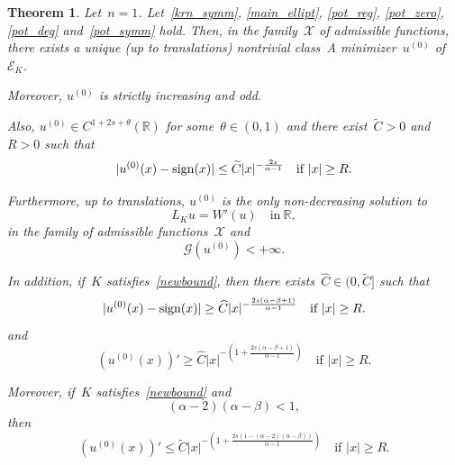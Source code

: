 \documentclass[10pt,a4paper]{amsart}
\newtheorem{theorem}{Theorem}[section]
\numberwithin{equation}{section}
\newcommand{\R}{\mathbb{R}}
\newcommand{\Ec}{\mathcal{E}_K}
\begin{document}
  \begin{theorem}\label{main_thm_symm}
Let~$n=1$. Let~\eqref{krn_symm}, \eqref{main_ellipt}, \eqref{pot_reg}, \eqref{pot_zero}, \eqref{pot_deg} and~\eqref{pot_symm} hold.	         
	         Then, in the family~$\mathcal{X}$ of admissible functions, there exists a unique (up to translations) nontrivial class~A minimizer~$u^{(0)}$ of~$\Ec$.
	         
	         Moreover, $u^{(0)}$ is strictly increasing and odd.
	         
	         Also, $u^{(0)} \in C^{1+2s +{\theta}}(\R)$ for some~$\theta \in (0,1)$ and there exist~$\widetilde{C}> 0$ and~$R>0$ such that
          \begin{equation}\label{asymp_decay_symm}
          | u^{(0)}(x)- {\rm sign} (x) | \leq \widetilde{C} |x|^{-\frac{2s}{\alpha-1}} \quad\mbox{if } |x | \geq R.
          \end{equation}
             
Furthermore, up to translations, $u^{(0)}$ is the only non-decreasing solution to
              \begin{equation*}
                L_K u = W'(u) \quad \text{in}~\R,
            \end{equation*}  
            in the family of admissible functions~$\mathcal{X}$ and
\begin{equation*}
\mathcal{G}(u^{(0)}) <+\infty. 
\end{equation*}

In addition, if~$K$ satisfies~\eqref{newbound}, then there exists~$\widehat{C}\in (0,\widetilde{C}]$ such that
          \begin{equation}\label{asymp_decay_symm_lowbound}
          | u^{(0)}(x)- {\rm sign} (x) | \geq \widehat{C} |x|^{-\frac{2s(\alpha-\beta+1)}{\alpha-1}} \quad\mbox{if } | x | \geq R.
          \end{equation}
      and
          \begin{equation}\label{97e382d}
     (u^{(0)}(x))'   \geq    \widehat{C}|x|^{-\left(1+\frac{2s(\alpha-\beta+1)}{\alpha-1}\right)} \quad\mbox{if } | x | \geq R .
          \end{equation}

Moreover, if~$K$ satisfies~\eqref{newbound} and
\begin{equation}\label{gufiodghfdjeryueyu4i}
(\alpha-2)(\alpha-\beta)<1,\end{equation} then
\begin{equation}\label{98fgvrjfbgvvfoi88}
(u^{(0)}(x))' \leq \widetilde{C}|x|^{-\left(1+\frac{2s(1-(\alpha-2)(\alpha-\beta))}{\alpha-1}\right)} \quad\mbox{if } | x | \geq R.
\end{equation}
                \end{theorem}
                
\end{document}
